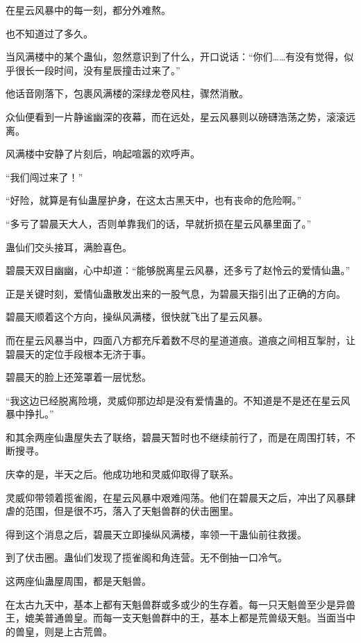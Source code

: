 
\begin{this_body}

在星云风暴中的每一刻，都分外难熬。

也不知道过了多久。

当风满楼中的某个蛊仙，忽然意识到了什么，开口说话：“你们……有没有觉得，似乎很长一段时间，没有星辰撞击过来了。”

他话音刚落下，包裹风满楼的深绿龙卷风柱，骤然消散。

众仙便看到一片静谧幽深的夜幕，而在远处，星云风暴则以磅礴浩荡之势，滚滚远离。

风满楼中安静了片刻后，响起喧嚣的欢呼声。

“我们闯过来了！”

“好险，就算是有仙蛊屋护身，在这太古黑天中，也有丧命的危险啊。”

“多亏了碧晨天大人，否则单靠我们的话，早就折损在星云风暴里面了。”

蛊仙们交头接耳，满脸喜色。

碧晨天双目幽幽，心中却道：“能够脱离星云风暴，还多亏了赵怜云的爱情仙蛊。”

正是关键时刻，爱情仙蛊散发出来的一股气息，为碧晨天指引出了正确的方向。

碧晨天顺着这个方向，操纵风满楼，很快就飞出了星云风暴。

而在星云风暴当中，四面八方都充斥着数不尽的星道道痕。道痕之间相互掣肘，让碧晨天的定位手段根本无济于事。

碧晨天的脸上还笼罩着一层忧愁。

“我这边已经脱离险境，灵威仰那边却是没有爱情蛊的。不知道是不是还在星云风暴中挣扎。”

和其余两座仙蛊屋失去了联络，碧晨天暂时也不继续前行了，而是在周围打转，不断搜寻。

庆幸的是，半天之后。他成功地和灵威仰取得了联系。

灵威仰带领着揽雀阁，在星云风暴中艰难闯荡。他们在碧晨天之后，冲出了风暴肆虐的范围，但是很不巧，落入了天魁兽群的伏击圈里。

得到这个消息之后，碧晨天立即操纵风满楼，率领一干蛊仙前往救援。

到了伏击圈。蛊仙们发现了揽雀阁和角连营。无不倒抽一口冷气。

这两座仙蛊屋周围，都是天魁兽。

在太古九天中，基本上都有天魁兽群或多或少的生存着。每一只天魁兽至少是异兽王，媲美普通兽皇。而每一支天魁兽群中的王，基本上都是荒兽级天魁。当面当中的兽皇，则是上古荒兽。


\end{this_body}
